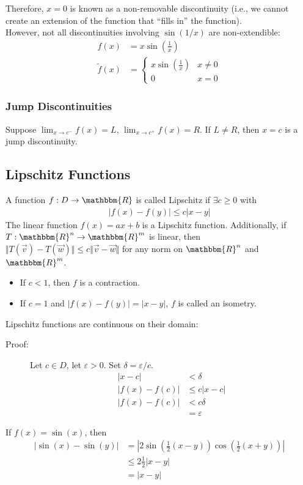 \documentclass[10pt]{extarticle}
\newcommand{\R}{\mathbbm{R}}
\begin{document}
    Therefore, $x = 0$ is known as a non-removable discontinuity (i.e., we cannot create an extension of the function that ``fills in'' the function).\\

    However, not all discontinuities involving $\sin(1/x)$ are non-extendible:
    \begin{align*}
      f(x) &= x\sin\left(\frac{1}{x}\right)\\
      \tilde{f}(x) &= \begin{cases}
        x\sin\left(\frac{1}{x}\right) & x\neq 0\\
        0 & x = 0
      \end{cases}
    \end{align*}
    \subsubsection{Jump Discontinuities}%
    Suppose $\lim_{x\rightarrow c^-}f(x) = L$, $\lim_{x\rightarrow c^+} f(x) = R$. If $L \neq R$, then $x = c$ is a jump discontinuity.
  \subsection{Lipschitz Functions}%
    A function $f: D\rightarrow \R$ is called Lipschitz if $\exists c \geq 0$ with 
    \begin{align*}
      |f(x) - f(y)| \leq c|x-y| \tag*{$\forall x,y\in D$}
    \end{align*}
    The linear function $f(x) = ax + b$ is a Lipschitz function. Additionally, if $T: \R^n \rightarrow \R^m$ is linear, then $\Vert T(\vec{v}) - T(\vec{w})\Vert \leq c\Vert \vec{v}-\vec{w}\Vert$ for any norm on $\R^n$ and $\R^m$.
    \begin{itemize}
      \item If $c < 1$, then $f$ is a contraction.
      \item If $c = 1$ and $|f(x) - f(y)| = |x-y|$, $f$ is called an isometry.
    \end{itemize}
    Lipschitz functions are continuous on their domain:
    \begin{description}
      \item[Proof:] Let $c\in D$, let $\varepsilon > 0$. Set $\delta = \varepsilon/c$.
        \begin{align*}
          |x-c| &< \delta\\
          |f(x) - f(c)| &\leq c|x-c|\\
          |f(x) - f(c)| &< c\delta\\
                        &= \varepsilon
        \end{align*}
    \end{description}
    If $f(x) = \sin(x)$, then
    \begin{align*}
      |\sin(x) - \sin(y)| &= \left|2\sin\left(\frac{1}{2}(x-y)\right)\cos\left(\frac{1}{2}(x+y)\right)\right|\\
                          &\leq 2\frac{1}{2}|x-y|\\
                          &= |x-y|
    \end{align*}
\end{document}
